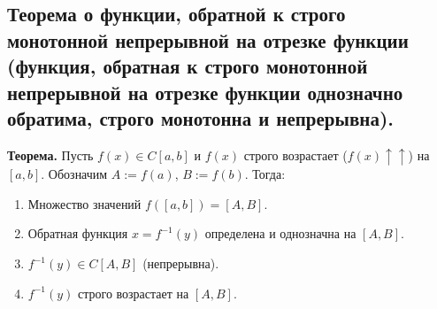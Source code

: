 \subsection{Теорема о функции, обратной к строго монотонной непрерывной на отрезке функции (функция, обратная к строго монотонной непрерывной на отрезке функции однозначно обратима, строго монотонна и непрерывна).}

\textbf{Теорема.} Пусть $f(x) \in C[a, b]$ и $f(x)$ строго возрастает ($f(x) \uparrow\uparrow$) на $[a, b]$.
Обозначим $A := f(a)$, $B := f(b)$.
Тогда:
\begin{enumerate}
    \item Множество значений $f([a, b]) = [A, B]$.
    \item Обратная функция $x = f^{-1}(y)$ определена и однозначна на $[A, B]$.
    \item $f^{-1}(y) \in C[A, B]$ (непрерывна).
    \item $f^{-1}(y)$ строго возрастает на $[A, B]$.
\end{enumerate}

